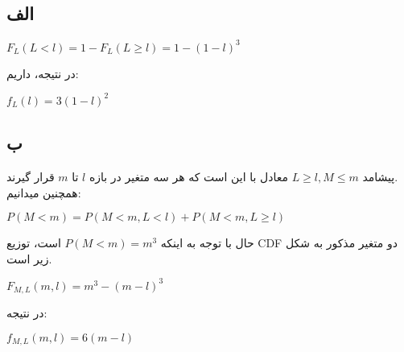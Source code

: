 \subsection*{الف}
\begin{center}
	$ F_L(L < l) = 1 - F_L(L \geq l) = 1 - (1 - l)^3 $
\end{center}
در نتیجه، داریم:

\begin{center}
	$ f_L(l) = 3(1 - l)^2 $
\end{center}

\subsection*{ب}
پیشامد
$ L \geq l, M \leq m $
معادل با این است که هر سه متغیر در بازه
$ l $
تا
$ m $
قرار گیرند.
\\
همچنین میدانیم:
\begin{center}
	$ P(M < m) = P(M < m, L < l) + P(M < m, L \geq l)$
\end{center}
حال با توجه به اینکه
$ P(M < m) = m^3 $
است، توزیع CDF دو متغیر مذکور به شکل زیر است.
\begin{center}
	$ F_{M,L}(m, l) = m^3 - (m - l)^3 $
\end{center}
در نتیجه:
\begin{center}
	$ f_{M,L}(m, l) = 6(m - l) $
\end{center}
